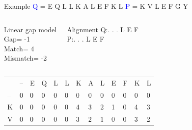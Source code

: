 \documentclass{bredelebeamer}
\begin{document}
 \begin{frame}{Example}
 \centering
 \textcolor{blue}{Q} = E Q L L K A L E F K L \quad \textcolor{blue}{P} = K V L E F G Y
\begin{columns}
\begin{block}{Linear gap model} \\
Gap= -1 \\
Match= 4 \\
Mismatch= -2
\end{block}
\begin{block}{Alignment}
Q:\quad . . . L E F \\
P:\quad . . . L E F
\end{block}
\end{columns}

\begin{table}[]
\centering
\begin{tabular}{*{13}{p{0.4cm}}}
                        & --                     & E                      & Q                      & L                      & L                      & K                      & A                      & \cellcolor[HTML]{FFFF00}L                      &E                       & F                                               & K                       & L                       \\ \cline{2-13} 
\multicolumn{1}{l|}{--} & \multicolumn{1}{l|}{0} & \multicolumn{1}{l|}{0} & \multicolumn{1}{l|}{0} & \multicolumn{1}{l|}{0} & \multicolumn{1}{l|}{0} & \multicolumn{1}{l|}{0} & \multicolumn{1}{l|}{0} & \multicolumn{1}{l|}{0} & \multicolumn{1}{l|}{0}  & \multicolumn{1}{l|}{0}                          & \multicolumn{1}{l|}{0}  & \multicolumn{1}{l|}{0}  \\ \cline{2-13} 
\multicolumn{1}{l|}{K}  & \multicolumn{1}{l|}{0} & \multicolumn{1}{l|}{0} & \multicolumn{1}{l|}{0} & \multicolumn{1}{l|}{0} & \multicolumn{1}{l|}{0} & \multicolumn{1}{l|}{4} & \multicolumn{1}{l|}{3} & \multicolumn{1}{l|}{2} & \multicolumn{1}{l|}{1}  & \multicolumn{1}{l|}{0}                          & \multicolumn{1}{l|}{4}  & \multicolumn{1}{l|}{3}  \\ \cline{2-13}  %
\multicolumn{1}{l|}{V}  & \multicolumn{1}{l|}{0} & \multicolumn{1}{l|}{0} & \multicolumn{1}{l|}{0} & \multicolumn{1}{l|}{0} & \multicolumn{1}{l|}{0} & \multicolumn{1}{l|}{3} & \multicolumn{1}{l|}{2} & \multicolumn{1}{l|}{1} & \multicolumn{1}{l|}{0}  & \multicolumn{1}{l|}{0}                          & \multicolumn{1}{l|}{3}  & \multicolumn{1}{l|}{2}  \\ \cline{2-13} 

\end{tabular}
\end{table}
\end{frame}
\end{document}
